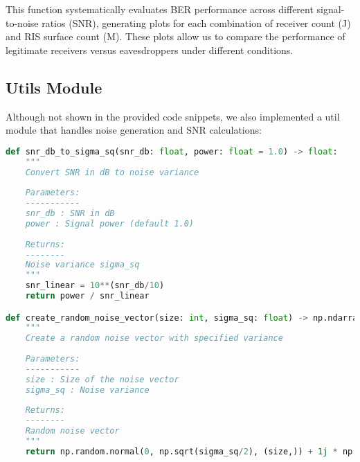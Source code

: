 This function systematically evaluates BER performance across different signal-to-noise ratios (SNR), generating plots for each combination of receiver count (J) and RIS surface count (M). These plots allow us to compare the performance of legitimate receivers versus eavesdroppers under different conditions.

\subsection{Utils Module}

Although not shown in the provided code snippets, we also implemented a util module that handles noise generation and SNR calculations:

\begin{lstlisting}[language=python, caption={Util Module Functions}]
def snr_db_to_sigma_sq(snr_db: float, power: float = 1.0) -> float:
    """
    Convert SNR in dB to noise variance
    
    Parameters:
    -----------
    snr_db : SNR in dB
    power : Signal power (default 1.0)
    
    Returns:
    --------
    Noise variance sigma_sq
    """
    snr_linear = 10**(snr_db/10)
    return power / snr_linear

def create_random_noise_vector(size: int, sigma_sq: float) -> np.ndarray:
    """
    Create a random noise vector with specified variance
    
    Parameters:
    -----------
    size : Size of the noise vector
    sigma_sq : Noise variance
    
    Returns:
    --------
    Random noise vector
    """
    return np.random.normal(0, np.sqrt(sigma_sq/2), (size,)) + 1j * np.random.normal(0, np.sqrt(sigma_sq/2), (size,))
\end{lstlisting}
